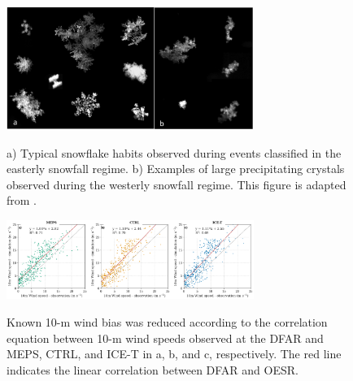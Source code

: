 \documentclass{ametsocV5}
\begin{document}
\begin{figure}
    \noindent\includegraphics[width=19pc,angle=0]{fig5.jpg}\\
    \caption{a) Typical snowflake habits observed during events classified in the easterly snowfall regime. b) Examples of large precipitating crystals observed during the westerly snowfall regime. This figure is adapted from \protect\citet{schirle_estimation_2019}.
    }
    \label{fig:snowflakes}
\end{figure}

\begin{figure}
    \noindent\includegraphics[width=19pc,angle=0]{fig6.png}\\
    \caption{Known 10-m wind bias \citep{frogner_convection-permitting_2019} was reduced according to the correlation equation between 10-m wind speeds observed at the DFAR and MEPS, CTRL, and ICE-T in a, b, and c, respectively. The red line indicates the linear correlation between DFAR and OESR.
    }
    \label{fig:WS_correlation}
\end{figure}
\end{document}

